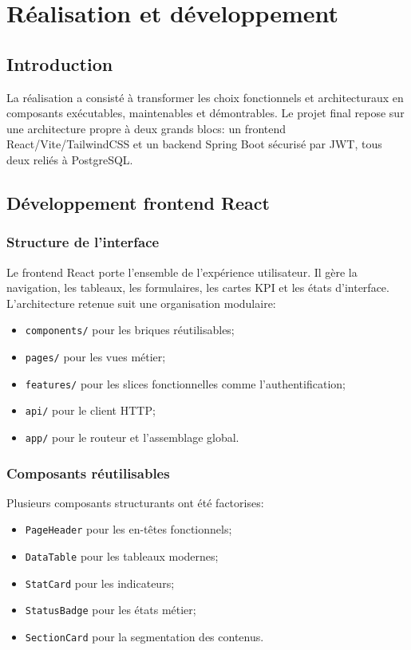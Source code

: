 ﻿\documentclass[12pt,a4paper,oneside]{report}
\begin{document}


\chapter{Réalisation et développement}
\label{chap:implementation}

\section{Introduction}
La réalisation a consisté à transformer les choix fonctionnels et architecturaux en composants exécutables, maintenables et démontrables. Le projet final repose sur une architecture propre à deux grands blocs: un frontend React/Vite/TailwindCSS et un backend Spring Boot sécurisé par JWT, tous deux reliés à PostgreSQL.

\section{Développement frontend React}
\subsection{Structure de l'interface}
Le frontend React porte l'ensemble de l'expérience utilisateur. Il gère la navigation, les tableaux, les formulaires, les cartes KPI et les états d'interface. L'architecture retenue suit une organisation modulaire:
\begin{itemize}
  \item \texttt{components/} pour les briques réutilisables;
  \item \texttt{pages/} pour les vues métier;
  \item \texttt{features/} pour les slices fonctionnelles comme l'authentification;
  \item \texttt{api/} pour le client HTTP;
  \item \texttt{app/} pour le routeur et l'assemblage global.
\end{itemize}

\subsection{Composants réutilisables}
Plusieurs composants structurants ont été factorises:
\begin{itemize}
  \item \texttt{PageHeader} pour les en-têtes fonctionnels;
  \item \texttt{DataTable} pour les tableaux modernes;
  \item \texttt{StatCard} pour les indicateurs;
  \item \texttt{StatusBadge} pour les états métier;
  \item \texttt{SectionCard} pour la segmentation des contenus.
\end{itemize}
\end{document}
